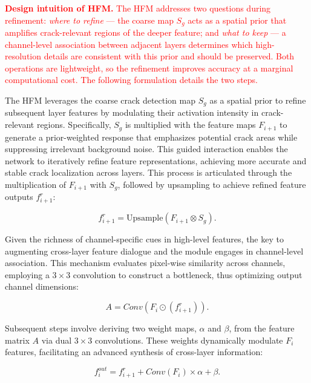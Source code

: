 \documentclass[journal]{IEEEtran}
\begin{document}
\textcolor{red}{\textbf{Design intuition of HFM.} The HFM addresses two questions during refinement: \emph{where to refine} --- the coarse map $S_g$ acts as a spatial prior that amplifies crack-relevant regions of the deeper feature; and \emph{what to keep} --- a channel-level association between adjacent layers determines which high-resolution details are consistent with this prior and should be preserved. Both operations are lightweight, so the refinement improves accuracy at a marginal computational cost. The following formulation details the two steps.}

The HFM leverages the coarse crack detection map $S_g$ as a spatial prior to refine subsequent layer features by modulating their activation intensity in crack-relevant regions. 
Specifically, $S_g$ is multiplied with the feature maps $F_{i+1}$ to generate a prior-weighted response that emphasizes potential crack areas while suppressing irrelevant background noise. 
This guided interaction enables the network to iteratively refine feature representations, achieving more accurate and stable crack localization across layers.
This process is articulated through the multiplication of $F_{i+1}$ with $S_g$, followed by upsampling to achieve refined feature outputs $f^r_{i+1}$:



\begin{equation}
f^r_{i+1} = \text{Upsample}(F_{i+1} \otimes S_g).
\end{equation}

Given the richness of channel-specific cues in high-level features, the key to augmenting cross-layer feature dialogue and the module engages in channel-level association. This mechanism evaluates pixel-wise similarity across channels, employing a $3 \times 3$ convolution to construct a bottleneck, thus optimizing output channel dimensions:

\begin{equation}
A = Conv(F_{i} \odot (f^r_{i+1})).
\end{equation}

Subsequent steps involve deriving two weight maps, $\alpha$ and $\beta$, from the feature matrix $A$ via dual $3 \times 3$ convolutions. These weights dynamically modulate $F_{i}$ features, facilitating an advanced synthesis of cross-layer information:

\begin{equation}
f^{out}_{i} = f^r_{i+1} + Conv(F_{i}) \times \alpha + \beta.
\end{equation}
\end{document}
